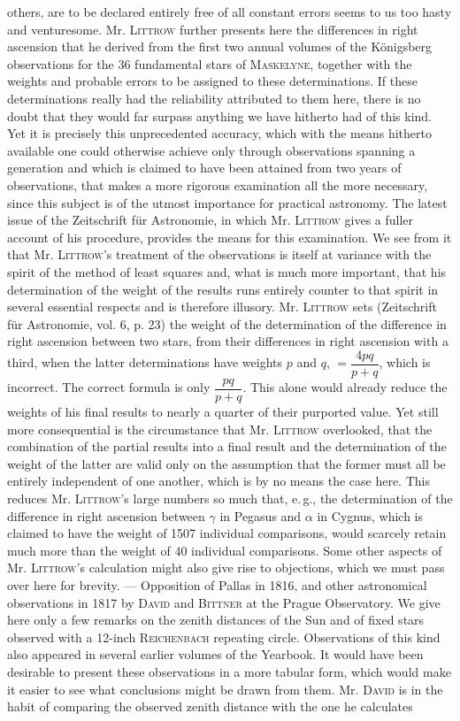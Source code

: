 others, are to be declared entirely free of all constant errors seems to us too hasty and venturesome. Mr. \textsc{Littrow} further presents here the differences in right ascension that he derived from the first two annual volumes of the Königsberg observations for the 36 fundamental stars of \textsc{Maskelyne}, together with the weights and probable errors to be assigned to these determinations. If these determinations really had the reliability attributed to them here, there is no doubt that they would far surpass anything we have hitherto had of this kind. Yet it is precisely this unprecedented accuracy, which with the means hitherto available one could otherwise achieve only through observations spanning a generation and which is claimed to have been attained from two years of observations, that makes a more rigorous examination all the more necessary, since this subject is of the utmost importance for practical astronomy. The latest issue of the Zeitschrift für Astronomie, in which Mr. \textsc{Littrow} gives a fuller account of his procedure, provides the means for this examination. We see from it that Mr. \textsc{Littrow}'s treatment of the observations is itself at variance with the spirit of the method of least squares and, what is much more important, that his determination of the weight of the results runs entirely counter to that spirit in several essential respects and is therefore illusory. Mr. \textsc{Littrow} sets (Zeitschrift für Astronomie, vol. 6, p. 23) the weight of the determination of the difference in right ascension between two stars, from their differences in right ascension with a third, when the latter determinations have weights $p$ and $q$, $=\dfrac{4pq}{p+q}$, which is incorrect. The correct formula is only $\dfrac{pq}{p+q}$. This alone would already reduce the weights of his final results to nearly a quarter of their purported value. Yet still more consequential is the circumstance that Mr. \textsc{Littrow} overlooked, that the combination of the partial results into a final result and the determination of the weight of the latter are valid only on the assumption that the former must all be entirely independent of one another, which is by no means the case here. This reduces Mr. \textsc{Littrow}'s large numbers so much that, e.\,g., the determination of the difference in right ascension between $\gamma$ in Pegasus and $\alpha$ in Cygnus, which is claimed to have the weight of 1507 individual comparisons, would scarcely retain much more than the weight of 40 individual comparisons. Some other aspects of Mr. \textsc{Littrow}'s calculation might also give rise to objections, which we must pass over here for brevity. --- Opposition of Pallas in 1816, and other astronomical observations in 1817 by \textsc{David} and \textsc{Bittner} at the Prague Observatory. We give here only a few remarks on the zenith distances of the Sun and of fixed stars observed with a 12-inch \textsc{Reichenbach} repeating circle. Observations of this kind also appeared in several earlier volumes of the Yearbook. It would have been desirable to present these observations in a more tabular form, which would make it easier to see what conclusions might be drawn from them. Mr. \textsc{David} is in the habit of comparing the observed zenith distance with the one he calculates 